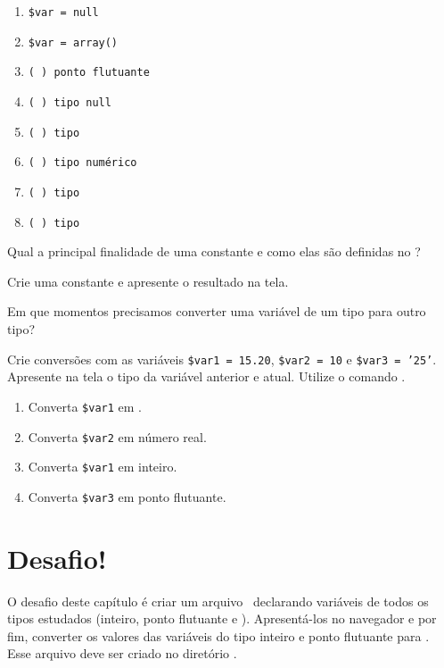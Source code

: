 \begin{description}[labelindent=30pt]
\begin{multicols}{2}
\begin{enumerate}
      \item[] \texttt{\$var = null}
      \item[] \texttt{\$var = array()}
      \item[] \texttt{( ) ponto flutuante}
      \item[] \texttt{( ) tipo null}
      \item[] \texttt{( ) tipo \tipostring}
      \item[] \texttt{( ) tipo numérico}
      \item[] \texttt{( ) tipo \booleano}
      \item[] \texttt{( ) tipo \tipoarray}
    \end{enumerate}
  \end{multicols}
  \item [Q. 08] Qual a principal finalidade de uma constante e como elas são definidas no \php?
  \item [Q. 09] Crie uma constante e apresente o resultado na tela.
  \item [Q. 10] Em que momentos precisamos converter uma variável de um tipo para outro tipo?
  \item [Q. 11] Crie conversões com as variáveis \texttt{\$var1 = 15.20}, \texttt{\$var2 = 10} e 
  \texttt{\$var3 = '25'}. Apresente na tela o tipo da variável anterior e atual. Utilize o comando 
  \funcaogettype.
  \begin{enumerate}
    \item Converta \texttt{\$var1} em \tipostring.
    \item Converta \texttt{\$var2} em número real.
    \item Converta \texttt{\$var1} em inteiro.
    \item Converta \texttt{\$var3} em ponto flutuante. 
  \end{enumerate}
\end{description}

\section{Desafio!}
\label{cap3-desafio}
O desafio deste capítulo é criar um arquivo \phpextensao~declarando variáveis de todos os tipos
estudados (inteiro, ponto flutuante e \tipostring). Apresentá-los no navegador e por fim, converter
os valores das variáveis do tipo inteiro e ponto flutuante para \tipostring. Esse arquivo
deve ser criado no diretório .

